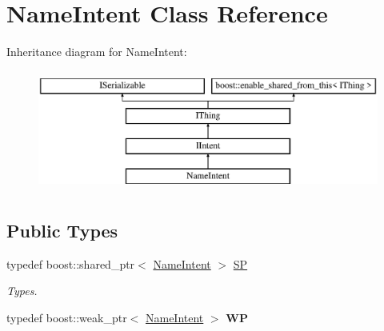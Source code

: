 \hypertarget{class_name_intent}{}\section{Name\+Intent Class Reference}
\label{class_name_intent}
Inheritance diagram for Name\+Intent\+:\begin{figure}[H]
\begin{center}
\leavevmode
\includegraphics[height=4.000000cm]{class_name_intent}
\end{center}
\end{figure}
\subsection*{Public Types}
\begin{DoxyCompactItemize}
\item 
\mbox{\label{class_name_intent_a9f5c8599f25b4a6ddefbcb466f222a78}} 
typedef boost\+::shared\+\_\+ptr$<$ \hyperlink{class_name_intent}{Name\+Intent} $>$ \hyperlink{class_name_intent_a9f5c8599f25b4a6ddefbcb466f222a78}{SP}
\begin{DoxyCompactList}\small\item\em Types. \end{DoxyCompactList}\item 
\mbox{\label{class_name_intent_ac2173c340b7bc11f6a097769734acb9f}} 
typedef boost\+::weak\+\_\+ptr$<$ \hyperlink{class_name_intent}{Name\+Intent} $>$ {\bfseries WP}
\end{DoxyCompactItemize}
